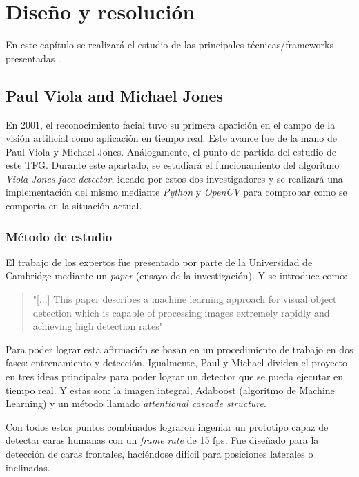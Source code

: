 
\chapter{Diseño y resolución}

En este capítulo se realizará el estudio de las principales técnicas/frameworks presentadas .

\section{Paul Viola and Michael Jones} \label{haar-like}

En 2001, el reconocimiento facial tuvo su primera aparición en el campo de la visión artificial como aplicación en tiempo real. Este avance fue de la mano de Paul Viola y Michael Jones. Análogamente, el punto de partida del estudio de este TFG. Durante este apartado, se estudiará el funcionamiento del algoritmo \textit{Viola-Jones face detector}, ideado por estos dos investigadores y se realizará una implementación del mismo mediante \textit{Python} y \textit{OpenCV} para comprobar como se comporta en la situación actual.

\subsection*{Método de estudio}

El trabajo de los expertos fue presentado por parte de la Universidad de Cambridge mediante un \textit{paper} (ensayo de la investigación). Y se introduce como: 
\begin{quote}
	"[...] This paper describes a machine learning approach for visual object detection which is capable of processing images extremely rapidly and achieving high detection rates" \cite{paulViola}
\end{quote}

Para poder lograr esta afirmación se basan en un procedimiento de trabajo en dos fases: entrenamiento y detección. Igualmente, Paul y Michael dividen el proyecto en tres ideas principales para poder lograr un detector que se pueda ejecutar en tiempo real. Y estas son: la imagen integral, Adaboost (algoritmo de Machine Learning) y un método llamado \textit{attentional cascade structure}. 

Con todos estos puntos combinados lograron ingeniar un prototipo capaz de detectar caras humanas con un \textit{frame rate} de 15 fps. Fue diseñado para la detección de caras frontales, haciéndose difícil para posiciones laterales o inclinadas.

